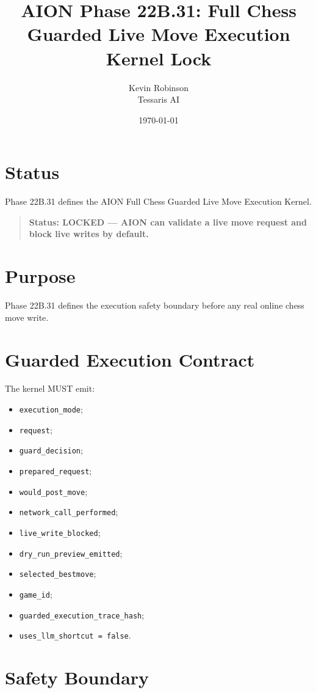 \documentclass[11pt,a4paper]{article}
\title{\textbf{AION Phase 22B.31: Full Chess Guarded Live Move Execution Kernel Lock}}
\author{Kevin Robinson\\Tessaris AI}
\date{\today}
\begin{document}
\maketitle

\section{Status}

Phase 22B.31 defines the AION Full Chess Guarded Live Move Execution Kernel.

\begin{quote}
\textbf{Status: LOCKED --- AION can validate a live move request and block live writes by default.}
\end{quote}

\section{Purpose}

Phase 22B.31 defines the execution safety boundary before any real online chess move write.

\section{Guarded Execution Contract}

The kernel MUST emit:

\begin{itemize}
  \item \texttt{execution\_mode};
  \item \texttt{request};
  \item \texttt{guard\_decision};
  \item \texttt{prepared\_request};
  \item \texttt{would\_post\_move};
  \item \texttt{network\_call\_performed};
  \item \texttt{live\_write\_blocked};
  \item \texttt{dry\_run\_preview\_emitted};
  \item \texttt{selected\_bestmove};
  \item \texttt{game\_id};
  \item \texttt{guarded\_execution\_trace\_hash};
  \item \texttt{uses\_llm\_shortcut = false}.
\end{itemize}

\section{Safety Boundary}
\end{document}
